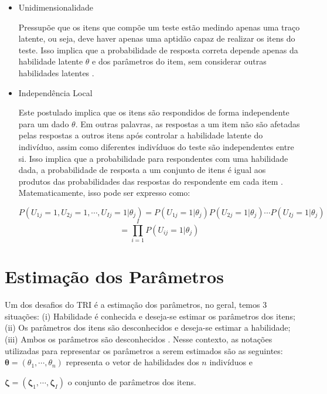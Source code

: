 \begin{itemize}
	
\item  Unidimensionalidade

Pressupõe que os itens que compõe um teste estão medindo apenas uma traço latente, ou seja, deve haver apenas uma aptidão capaz de realizar os itens do teste. Isso implica que a probabilidade de resposta correta depende apenas da habilidade latente $\theta$ e dos parâmetros do item, sem considerar outras habilidades latentes \cite{pasquali1996}.

\item  Independência Local

Este postulado implica que os itens são respondidos de forma independente para um dado $\theta$. Em outras palavras, as respostas a um item não são afetadas pelas respostas a outros itens após controlar a habilidade latente do indivíduo, assim como diferentes indivíduos do teste são independentes entre si. Isso implica que a probabilidade para respondentes com uma habilidade dada, a probabilidade de resposta a um conjunto de itens é igual aos produtos das probabilidades das respostas do respondente em cada item \cite{pasquali1996}. Matematicamente, isso pode ser expresso como:


\[
 P(U_{1j} = 1, U_{2j} = 1, \cdots, U_{Ij} = 1 |\theta_j) = 
 P(U_{1j} = 1|\theta_j)  P(U_{2j} = 1|\theta_j) \cdots P(U_{Ij} = 1|\theta_j) 
\] 
\[
 = \prod_{i=1}^{I}P(U_{ij} = 1|\theta_j) 
\]

\end{itemize}
\section{Estimação dos Parâmetros}



Um dos desafios do TRI é a estimação dos parâmetros, no geral, temos 3 situações:  (i) Habilidade é conhecida e deseja-se estimar os parâmetros dos itens; (ii) Os parâmetros dos itens são desconhecidos e deseja-se estimar a habilidade; (iii) Ambos os parâmetros são desconhecidos \cite{de2000teoria}.  Nesse contexto, as notações utilizadas para representar os parâmetros a serem estimados são as seguintes:\\


\noindent $ \boldsymbol{\theta} = (\theta_1, \cdots, \theta_n) $  representa o vetor de habilidades dos $n$ indivíduos e

\noindent $ \boldsymbol{\zeta} = (\boldsymbol{\zeta}_1, \cdots, \boldsymbol{\zeta}_I) $ o conjunto de parâmetros dos itens.

